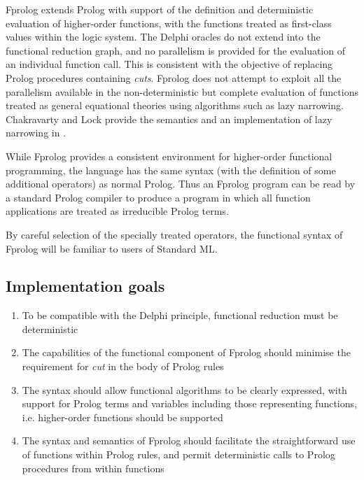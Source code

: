 \documentclass[a4paper,11pt,twoside]{article}
\begin{document}
Fprolog extends Prolog with support of the definition and deterministic
evaluation of higher-order functions, with the functions treated as
first-class values within the logic system.  The Delphi oracles do not
extend into the functional reduction graph, and no parallelism is provided for
the evaluation of an individual function call.  This is consistent with the
objective of replacing Prolog procedures containing \textit{cuts}.  
Fprolog does not
attempt to exploit all the parallelism available in the non-deterministic but
complete evaluation of functions treated as general equational theories using
algorithms such as lazy narrowing.  Chakravarty and Lock provide the semantics and
an implementation of lazy narrowing in \cite{CL91}.

While Fprolog provides a consistent environment for
higher-order functional
programming, the language has the same syntax (with the definition of some
additional operators) as normal Prolog.  Thus an Fprolog program can be
read by a standard Prolog compiler to produce a program in which all
function applications are treated as irreducible Prolog terms.

By careful selection of the specially treated operators, the functional
syntax of Fprolog will be familiar to users of Standard ML.

\subsection{Implementation goals}

\begin{enumerate}
\item{To  be compatible with the Delphi principle, functional reduction
  must be deterministic}
\item{The capabilities of the functional component of Fprolog should
  minimise the requirement for \textit{cut} in the body of Prolog
  rules}
\item{The syntax should allow functional algorithms to be clearly expressed,
  with support for Prolog terms and variables including those representing
  functions, i.e. higher-order functions should be supported}
\item{The syntax and semantics of Fprolog should facilitate the
  straightforward use of functions within Prolog rules, and permit
  deterministic calls to Prolog procedures from within functions}
\end{enumerate}

\end{document}
